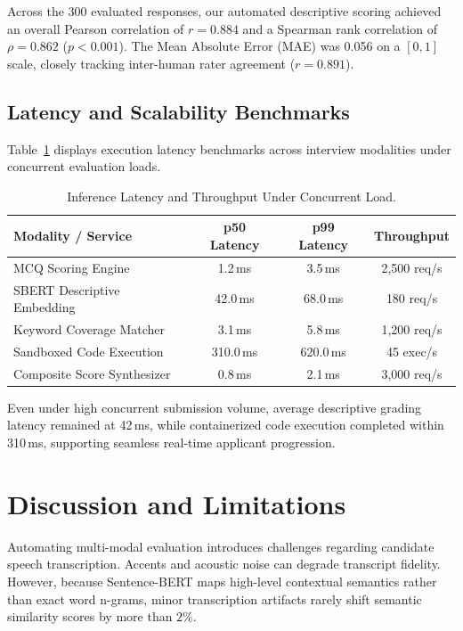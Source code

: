 \documentclass[conference]{IEEEtran}
\begin{document}
Across the 300 evaluated responses, our automated descriptive scoring achieved an overall Pearson correlation of $r = 0.884$ and a Spearman rank correlation of $\rho = 0.862$ ($p < 0.001$). The Mean Absolute Error (MAE) was 0.056 on a $[0, 1]$ scale, closely tracking inter-human rater agreement ($r = 0.891$).

\subsection{Latency and Scalability Benchmarks}
Table~\ref{tab:c2_latency} displays execution latency benchmarks across interview modalities under concurrent evaluation loads.

\begin{table}[htbp]
\caption{Inference Latency and Throughput Under Concurrent Load.}
\begin{center}
\begin{tabular}{lccc}
\toprule
\textbf{Modality / Service} & \textbf{p50 Latency} & \textbf{p99 Latency} & \textbf{Throughput} \\
\midrule
MCQ Scoring Engine          & 1.2\,ms   & 3.5\,ms   & 2,500 req/s \\
SBERT Descriptive Embedding & 42.0\,ms  & 68.0\,ms  & 180 req/s \\
Keyword Coverage Matcher    & 3.1\,ms   & 5.8\,ms   & 1,200 req/s \\
Sandboxed Code Execution    & 310.0\,ms & 620.0\,ms & 45 exec/s \\
Composite Score Synthesizer & 0.8\,ms   & 2.1\,ms   & 3,000 req/s \\
\bottomrule
\end{tabular}
\label{tab:c2_latency}
\end{center}
\end{table}

Even under high concurrent submission volume, average descriptive grading latency remained at 42\,ms, while containerized code execution completed within 310\,ms, supporting seamless real-time applicant progression.

\section{Discussion and Limitations}
Automating multi-modal evaluation introduces challenges regarding candidate speech transcription. Accents and acoustic noise can degrade transcript fidelity. However, because Sentence-BERT maps high-level contextual semantics rather than exact word n-grams, minor transcription artifacts rarely shift semantic similarity scores by more than $2\%$. 
\end{document}
